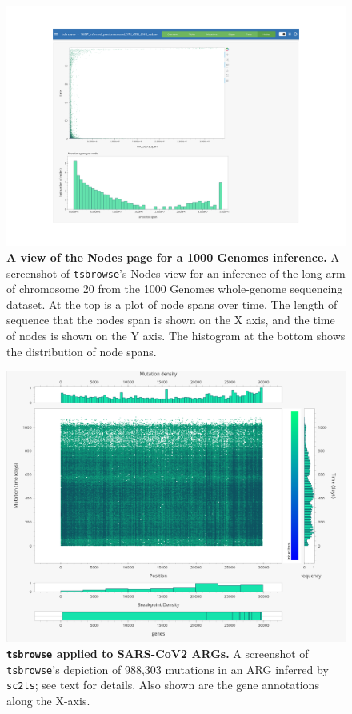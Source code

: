 \documentclass[unnumsec,webpdf,contemporary,large,namedate]{oup-authoring-template}%
\begin{document}
\begin{figure}
    \centering
    \includegraphics[width=0.95\linewidth]{figures/SuppFig3.png}
    \caption{\textbf{A view of the Nodes page for a 1000 Genomes inference.} A
screenshot of \texttt{tsbrowse}'s Nodes view for an inference of the long arm
of chromosome 20 from the 1000 Genomes whole-genome sequencing dataset. At the
top is a plot of node spans over time. The length of sequence that the nodes
span is shown on the X axis, and the time of nodes is shown on the Y axis. The
histogram at the bottom shows the distribution of node spans. }
    \label{fig:Supplementary_Figure_3}
\end{figure}

\begin{figure}
    \centering
    \includegraphics[width=0.95\linewidth]{figures/SuppFig4.png}
    \caption{\textbf{\texttt{tsbrowse} applied to SARS-CoV2 ARGs.}
    A screenshot of \texttt{tsbrowse}'s depiction of 988,303 mutations in an 
    ARG inferred by \texttt{sc2ts}; see  text for details. Also shown are the 
    gene annotations along the X-axis.}
    \label{fig:Supplementary_Figure_4}
\end{figure}
\end{document}
